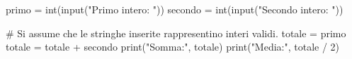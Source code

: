 \begin{unipdcode}[language=Python]
primo = int(input("Primo intero: "))
secondo = int(input("Secondo intero: "))

# Si assume che le stringhe inserite rappresentino interi validi.
totale = primo
totale = totale + secondo
print("Somma:", totale)
print("Media:", totale / 2)
\end{unipdcode}
